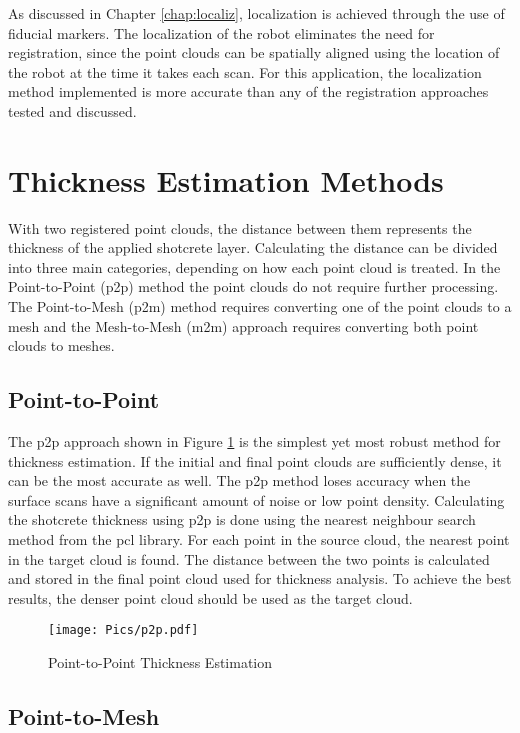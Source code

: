 As discussed in Chapter \ref{chap:localiz}, localization is achieved through the use of fiducial markers. The localization of the robot eliminates the need for registration, since the point clouds can be spatially aligned using the location of the robot at the time it takes each scan. For this application, the localization method implemented is more accurate than any of the registration approaches tested and discussed.
\section{Thickness Estimation Methods}

With two registered point clouds, the distance between them represents the thickness of the applied shotcrete layer. Calculating the distance can be divided into three main categories, depending on how each point cloud is treated. In the Point-to-Point (\acrshort{p2p}) method the point clouds do not require further processing. The Point-to-Mesh (\acrshort{p2m}) method requires converting one of the point clouds to a mesh and the Mesh-to-Mesh (\acrshort{m2m}) approach requires converting both point clouds to meshes.\\

\subsection{Point-to-Point}
The \acrshort{p2p} approach shown in Figure \ref{fig:p2pdia} is the simplest yet most robust method for thickness estimation. If the initial and final point clouds are sufficiently dense, it can be the most accurate as well. The \acrshort{p2p} method loses accuracy when the surface scans have a significant amount of noise or low point density. Calculating the shotcrete thickness using \acrshort{p2p} is done using the nearest neighbour search method from the \acrshort{pcl} library. For each point in the source cloud, the nearest point in the target cloud is found. The distance between the two points is calculated and stored in the final point cloud used for thickness analysis. To achieve the best results, the denser point cloud should be used as the target cloud.\\
\label{sec:p2p}
\begin{figure}[h!]
    \centering
    \texttt{[image: Pics/p2p.pdf]}
    \caption{Point-to-Point Thickness Estimation}
    \label{fig:p2pdia}
\end{figure}
\subsection{Point-to-Mesh}

